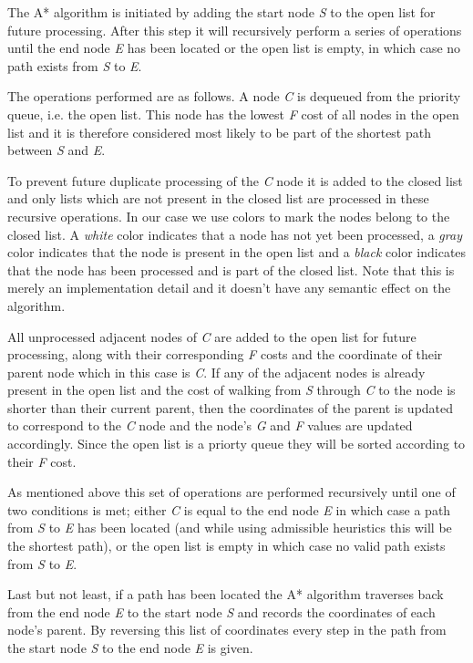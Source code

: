 \documentclass[12pt, a4paper]{article}
\begin{document}
The A* algorithm is initiated by adding the start node \textit{S} to the open
list for future processing. After this step it will recursively perform a series
of operations until the end node \textit{E} has been located or the open list is
empty, in which case no path exists from \textit{S} to \textit{E}.

The operations performed are as follows. A node \textit{C} is dequeued from the
priority queue, i.e. the open list. This node has the lowest \textit{F} cost of
all nodes in the open list and it is therefore considered most likely to be part
of the shortest path between \textit{S} and \textit{E}.

To prevent future duplicate processing of the \textit{C} node it is added to the
closed list and only lists which are not present in the closed list are
processed in these recursive operations. In our case we use colors to mark the
nodes belong to the closed list. A \textit{white} color indicates that a node
has not yet been processed, a \textit{gray} color indicates that the node is
present in the open list and a \textit{black} color indicates that the node has
been processed and is part of the closed list. Note that this is merely an
implementation detail and it doesn't have any semantic effect on the algorithm.

All unprocessed adjacent nodes of \textit{C} are added to the open list for
future processing, along with their corresponding \textit{F} costs and the
coordinate of their parent node which in this case is \textit{C}. If any of the
adjacent nodes is already present in the open list and the cost of walking from
\textit{S} through \textit{C} to the node is shorter than their current parent,
then the coordinates of the parent is updated to correspond to the \textit{C}
node and the node's \textit{G} and \textit{F} values are updated accordingly.
Since the open list is a priorty queue they will be sorted according to their
\textit{F} cost.

As mentioned above this set of operations are performed recursively until one of
two conditions is met; either \textit{C} is equal to the end node \textit{E} in
which case a path from \textit{S} to \textit{E} has been located (and while
using admissible heuristics this will be the shortest path), or the open list is
empty in which case no valid path exists from \textit{S} to \textit{E}.

Last but not least, if a path has been located the A* algorithm traverses back
from the end node \textit{E} to the start node \textit{S} and records the
coordinates of each node's parent. By reversing this list of coordinates every
step in the path from the start node \textit{S} to the end node \textit{E} is
given.
\end{document}
